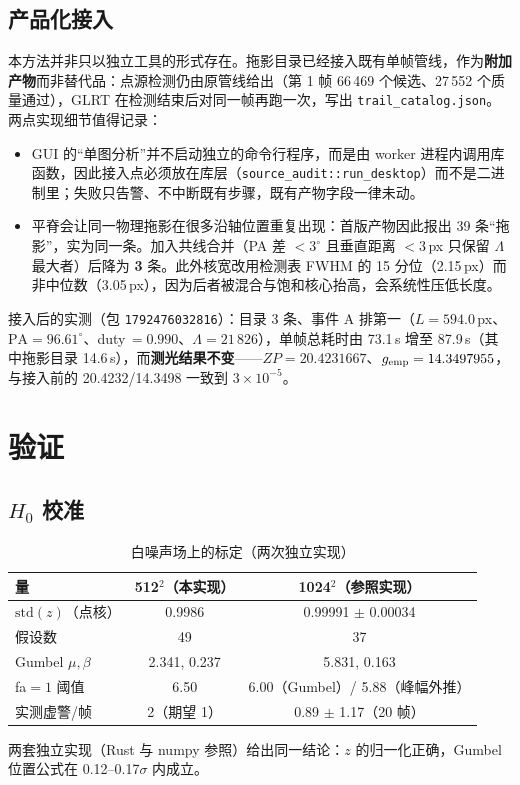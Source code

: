 \documentclass[11pt,a4paper]{ctexart}
\newcommand{\Lam}{\ensuremath{\Lambda}}
\begin{document}
\subsection{产品化接入}
本方法并非只以独立工具的形式存在。拖影目录已经接入既有单帧管线，作为\textbf{附加产物}而非替代品：点源检测仍由原管线给出（第 1 帧 66\,469 个候选、27\,552 个质量通过），GLRT 在检测结束后对同一帧再跑一次，写出 \texttt{trail\_catalog.json}。两点实现细节值得记录：
\begin{itemize}
\item GUI 的“单图分析”并不启动独立的命令行程序，而是由 worker 进程内调用库函数，因此接入点必须放在库层（\texttt{source\_audit::run\_desktop}）而不是二进制里；失败只告警、不中断既有步骤，既有产物字段一律未动。
\item 平脊会让同一物理拖影在很多沿轴位置重复出现：首版产物因此报出 39 条“拖影”，实为同一条。加入共线合并（PA 差 $<3^\circ$ 且垂直距离 $<3$\,px 只保留 $\Lam$ 最大者）后降为 \textbf{3} 条。此外核宽改用检测表 FWHM 的 15 分位（2.15\,px）而非中位数（3.05\,px），因为后者被混合与饱和核心抬高，会系统性压低长度。
\end{itemize}
接入后的实测（包 \texttt{1792476032816}）：目录 3 条、事件 A 排第一（$L=594.0$\,px、$\mathrm{PA}=96.61^\circ$、duty$\,=0.990$、$\Lam=21\,826$），单帧总耗时由 73.1\,s 增至 87.9\,s（其中拖影目录 14.6\,s），而\textbf{测光结果不变}——$ZP=20.4231667$、$g_{\rm emp}=14.3497955$，与接入前的 20.4232/14.3498 一致到 $3\times10^{-5}$。

\section{验证}
\subsection{$H_0$ 校准}\label{sec:h0}
\begin{table}[htbp]\centering\small
\caption{白噪声场上的标定（两次独立实现）}\label{tab:h0}
\begin{tabular}{@{}lcc@{}}
\toprule
量 & 512$^2$（本实现） & 1024$^2$（参照实现）\\
\midrule
$\mathrm{std}(z)$（点核） & 0.9986 & 0.99991 $\pm$ 0.00034\\
假设数 & 49 & 37\\
Gumbel $\mu,\beta$ & 2.341, 0.237 & 5.831, 0.163\\
fa$=1$ 阈值 & 6.50 & 6.00（Gumbel）/ 5.88（峰幅外推）\\
实测虚警/帧 & 2（期望 1） & 0.89 $\pm$ 1.17（20 帧）\\
\bottomrule
\end{tabular}
\end{table}
两套独立实现（Rust 与 numpy 参照）给出同一结论：$z$ 的归一化正确，Gumbel 位置公式在 0.12--0.17$\sigma$ 内成立。
\end{document}

